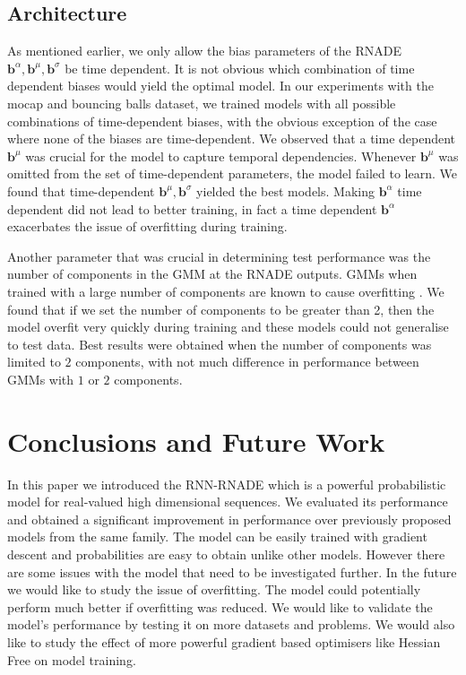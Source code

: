 \documentclass{article} %
\begin{document}
\subsection{Architecture}

As mentioned earlier, we only allow the bias parameters of the RNADE $\mathbf{b}^{\alpha},\mathbf{b}^{\mu},\mathbf{b}^{\sigma}$ be time dependent. It is not obvious which combination of time dependent biases would yield the optimal model. In our experiments with the mocap and bouncing balls dataset, we trained models with all possible combinations of time-dependent biases, with the obvious exception of the case where none of the biases are time-dependent. We observed that a time dependent $\mathbf{b}^{\mu}$ was crucial for the model to capture temporal dependencies. Whenever $\mathbf{b}^{\mu}$ was omitted from the set of time-dependent parameters, the model failed to learn. We found that time-dependent $\mathbf{b}^{\mu},\mathbf{b}^{\sigma}$ yielded the best models. Making $\mathbf{b}^{\alpha}$ time dependent did not lead to better training, in fact a time dependent $\mathbf{b}^{\alpha}$ exacerbates the issue of overfitting during training. 

Another parameter that was crucial in determining test performance was the number of components in the GMM at the RNADE outputs. GMMs when trained with a large number of components are known to cause overfitting \cite{bishop2006pattern}. We found that if we set the number of components to be greater than 2, then the model overfit very quickly during training and these models could not generalise to test data. Best results were obtained when the number of components was limited to $2$ components, with not much difference in performance between GMMs with $1$ or $2$ components.  

\section{Conclusions and Future Work}

In this paper we introduced the RNN-RNADE which is a powerful probabilistic model for real-valued high dimensional sequences. We evaluated its performance and obtained a significant improvement in performance over previously proposed models from the same family. The model can be easily trained with gradient descent and probabilities are easy to obtain unlike other models. However there are some issues with the model that need to be investigated further. In the future we would like to study the issue of overfitting. The model could potentially perform much better if overfitting was reduced. We would like to validate the model's performance by testing it on more datasets and problems. We would also like to study the effect of more powerful gradient based optimisers like Hessian Free on model training. 

\label{conclusion}



\end{document}
